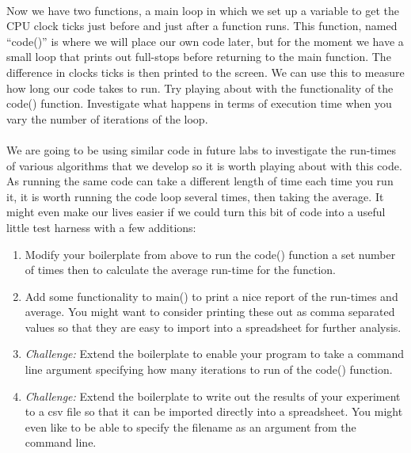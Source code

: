 \documentclass[10pt, a4paper, twosize]{article}
\begin{document}
\paragraph{} Now we have two functions, a main loop in which we set up a variable to get the CPU clock ticks just before and just after a function runs. This function, named ``code()'' is where we will place our own code later, but for the moment we have a small loop that prints out full-stops before returning to the main function. The difference in clocks ticks is then printed to the screen. We can use this to measure how long our code takes to run. Try playing about with the functionality of the code() function. Investigate what happens in terms of execution time when you vary the number of iterations of the loop.

\paragraph{} We are going to be using similar code in future labs to investigate the run-times of various algorithms that we develop so it is worth playing about with this code. As running the same code can take a different length of time each time you run it, it is worth running the code loop several times, then taking the average. It might even make our lives easier if we could turn this bit of code into a useful little test harness with a few additions:

\begin{enumerate}
\item Modify your boilerplate from above to run the code() function a set number of times then to calculate the average run-time for the function.
\item Add some functionality to main() to print a nice report of the run-times and average. You might want to consider printing these out as comma separated values so that they are easy to import into a spreadsheet for further analysis.
\item \emph{Challenge:} Extend the boilerplate to enable your program to take a command line argument specifying how many iterations to run of the code() function.
\item \emph{Challenge:} Extend the boilerplate to write out the results of your experiment to a csv file so that it can be imported directly into a spreadsheet. You might even like to be able to specify the filename as an argument from the command line.
\end{enumerate}
\end{document}
